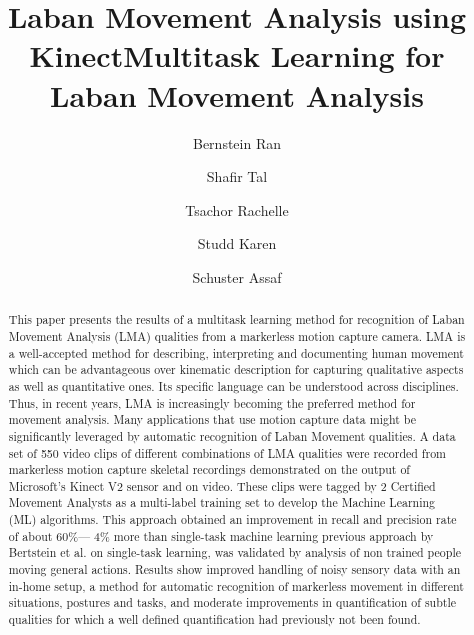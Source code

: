 \documentclass[11pt,twocolumn,varwidth=true,a4paper,fleqn]{sigchi}
\begin{document}
\nocite{*}
\title{Laban Movement Analysis using Kinect}

\author[1]{Bernstein Ran}
\author[2]{Shafir Tal}
\author[3]{Tsachor Rachelle}
\author[4]{Studd Karen}
\author[1]{Schuster Assaf}



\title{Multitask Learning for Laban Movement Analysis}
\date{}
\maketitle

\begin{abstract}
This paper presents the results of a multitask learning method for 
recognition of Laban Movement Analysis (LMA) qualities from a markerless motion 
capture camera.  LMA is a well-accepted method for describing, interpreting and 
documenting  human movement which can be advantageous over kinematic description 
for capturing qualitative aspects as well as quantitative ones.  Its specific 
language can be understood across disciplines.  Thus, in recent years, LMA is 
increasingly  becoming the preferred method for movement analysis.  
Many applications that use motion capture data might be significantly 
leveraged by automatic recognition of Laban Movement qualities. 
A data set of 550 video clips of different combinations of LMA qualities were 
recorded from markerless motion capture skeletal recordings demonstrated on the 
output of Microsoft's Kinect V2 sensor and on video.  These clips were tagged by 
2 Certified Movement Analysts as a multi-label training set to develop the Machine 
Learning (ML) algorithms.  This approach obtained an improvement in recall and precision rate of about 60\%--- 4\% more than single-task machine learning previous approach by Bertstein et al. on single-task learning,  was validated by analysis of
non trained people moving general actions.   Results show improved handling of noisy sensory data with an in-home setup, a method for automatic recognition of markerless movement in different situations, postures and tasks, and moderate improvements in quantification of subtle qualities for which a well defined quantification had previously not been found.
\end{abstract}
\end{document}
